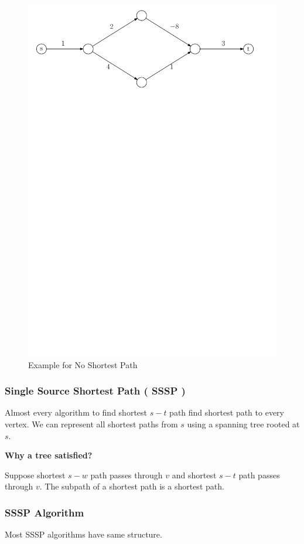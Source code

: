 \begin{figure}[ht!]
    \caption{Example for No Shortest Path}\label{fig:spexample}
    \centering
    \includegraphics[width=.9\linewidth]{fig/spExample}
\end{figure}

\subsubsection{Single Source Shortest Path ( SSSP )}
Almost every algorithm to find shortest $s-t$ path find
shortest path to every vertex. 
We can represent all shortest paths from $s$ using
a spanning tree rooted at $s$.

\textbf{Why a tree satisfied?}

Suppose shortest $s-w$ path passes through $v$
and shortest $s-t$ path passes through $v$.
The subpath of a shortest path is a shortest path.

\subsubsection{SSSP Algorithm}
Most SSSP algorithms have same structure.

